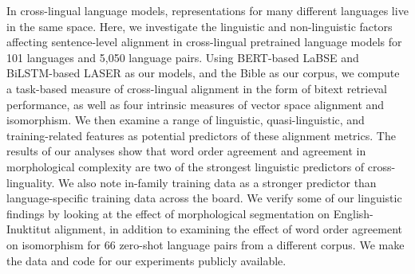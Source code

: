 In cross-lingual language models, representations for many different languages live in the same space. Here, we investigate the linguistic and non-linguistic factors affecting sentence-level alignment in cross-lingual pretrained language models for 101 languages and 5,050 language pairs. Using BERT-based LaBSE and BiLSTM-based LASER as our models, and the Bible as our corpus, we compute a task-based measure of cross-lingual alignment in the form of bitext retrieval performance, as well as four intrinsic measures of vector space alignment and isomorphism. We then examine a range of linguistic, quasi-linguistic, and training-related features as potential predictors of these alignment metrics. The results of our analyses show that word order agreement and agreement in morphological complexity are two of the strongest linguistic predictors of cross-linguality. We also note in-family training data as a stronger predictor than language-specific training data across the board. We verify some of our linguistic findings by looking at the effect of morphological segmentation on English-Inuktitut alignment, in addition to examining the effect of word order agreement on isomorphism for 66 zero-shot language pairs from a different corpus. We make the data and code for our experiments publicly available.
